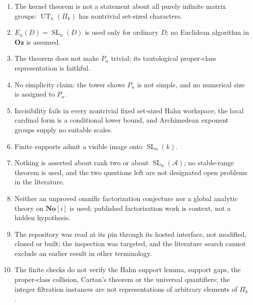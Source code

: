 \documentclass[11pt,oneside]{article}
\numberwithin{equation}{section}
\theoremstyle{definition}
\theoremstyle{remark}
\newcommand{\No}{\mathbf{No}}
\newcommand{\Oz}{\mathbf{Oz}}
\newcommand{\SC}{\No[i]}
\newcommand{\A}{\mathcal A}
\newcommand{\SL}{\operatorname{SL}}
\newcommand{\UT}{\operatorname{UT}}
\begin{document}
\begin{enumerate}[leftmargin=*,widest=00,label=06.\arabic*]
\item The kernel theorem is not a statement about all purely infinite matrix
groups: $\UT_n(\Pi_k)$ has nontrivial set-sized characters.
\item $E_n(D)=\SL_n(D)$ is used only for ordinary $D$; no Euclidean algorithm in
$\Oz$ is assumed.
\item The theorem does not make $P_n$ trivial; its tautological proper-class
representation is faithful.
\item No simplicity claim: the tower shows $P_n$ is not simple, and no numerical
size is assigned to $P_n$.
\item Invisibility fails in every nontrivial fixed set-sized Hahn workspace; the
local cardinal form is a conditional lower bound, and Archimedean exponent groups
supply no suitable scales.
\item Finite supports admit a visible image onto $\SL_n(k)$.
\item Nothing is asserted about rank two or about $\SL_n(\A)$; no stable-range
theorem is used, and the two questions left are not designated open problems in
the literature.
\item Neither an unproved omnific factorization conjecture nor a global analytic
theory on $\SC$ is used; published factorization work is context, not a hidden
hypothesis.
\item The repository was read at its pin through its hosted interface, not
modified, cloned or built; the inspection was targeted, and the literature search
cannot exclude an earlier result in other terminology.
\item The finite checks do not verify the Hahn support lemma, support gaps, the
proper-class collision, Cartan's theorem or the universal quantifiers; the integer
filtration instances are not representations of arbitrary elements of $\Pi_k$.
\end{enumerate}
\end{document}
